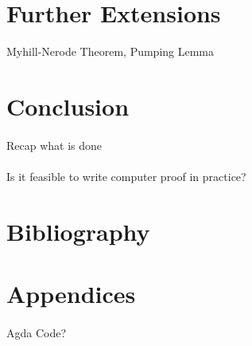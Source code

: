 \documentclass[twoside,openright,final]{bhamthesis}
\begin{document}
\newpage


\newpage


\newpage


\newpage
\section{Further Extensions}
\par Myhill-Nerode Theorem, Pumping Lemma

\newpage


\newpage
\section{Conclusion}
\paragraph{} Recap what is done

\paragraph{} Is it feasible to write computer proof in practice? 


\newpage
\section*{Bibliography}
\nocite{*}



\newpage
\section*{Appendices}
\paragraph{} Agda Code?
\end{document}
